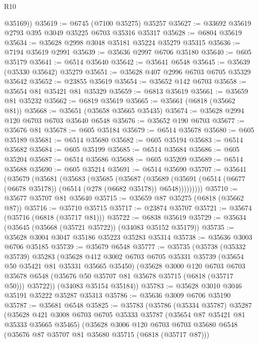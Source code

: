 \begin{lexlean}{R10}
\begin{coremodule}
        @35169))
@35619 := @6745 (@7100 @35275) @35257
@35627 := @33692 @35619 @2793 @395 @3049 @35225 @6703 @35316 @35317
@35628 := @6804 @35619
@35634 := @35628 @2998 @3048 @35181 @35224 @35279 @35315
@35636 := @7194 @35619 @2991
@35639 := @35636 @2997 @6706 @35180
@35640 := @605 @35179
@35641 := @6514 @35640
@35642 := @35641 @6548
@35645 := @35639 (@35330 @35642) @35279
@35651 := @35628 @407 @2996 @6703 @6705 @35329 @35642
@35652 := @23855 @35619
@35654 := @35652 @142 @6703
@35658 := @35654 @81 @35421 @81 @35329
@35659 := @6813 @35619
@35661 := @35659 @81 @35232
@35662 := @6819 @35619
@35665 := @35661 (@6818 (@35662 @81))
@35668 := @35651 (@35658 @35665 @35435)
@35674 := @35628 @2994 @120 @6703 @6703 @35640 @6548
@35676 := @35652 @190 @6703
@35677 := @35676 @81
@35678 := @605 @35184
@35679 := @6514 @35678
@35680 := @605 @35189
@35681 := @6514 @35680
@35682 := @605 @35194
@35683 := @6514 @35682
@35684 := @605 @35199
@35685 := @6514 @35684
@35686 := @605 @35204
@35687 := @6514 @35686
@35688 := @605 @35209
@35689 := @6514 @35688
@35690 := @605 @35214
@35691 := @6514 @35690
@35707 := @35641
    (@35679
      (@35681
        (@35683
          (@35685
            (@35687
              (@35689
                (@35691 (@6514 (@6677 (@6678 @35178)) (@6514 (@278 (@6682 @35178)) @6548)))))))))
@35710 := @35677 @35707 @81 @35640
@35715 := @35659 @87 @35275 (@6818 (@35662 @87))
@35716 := @35710 @35715
@35717 := @23874 @35707
@35721 := @35674 (@35716 (@6818 (@35717 @81)))
@35722 := @6838 @35619
@35729 := @35634 (@35645 (@35668 (@35721 @35722)) (@34083 @35152 @35179))
@35735 := @35628 @3004 @3047 @35186 @35223 @35283 @35314
@35738 := @35636 @3003 @6706 @35185
@35739 := @35679 @6548
@35777 := @35735
    (@35738
      (@35332 @35739)
      @35283
      (@35628
        @412
        @3002
        @6703
        @6705
        @35331
        @35739
        (@35654 @50 @35421 @81 @35331 @35665 @35450)
        (@35628
          @3000
          @120
          @6703
          @6703
          @35678
          @6548
          (@35676 @50 @35707 @81 @35678 @35715 (@6818 (@35717 @50)))
          @35722))
      (@34083 @35154 @35184))
@35783 := @35628 @3010 @3046 @35191 @35222 @35287 @35313
@35786 := @35636 @3009 @6706 @35190
@35787 := @35681 @6548
@35825 := @35783
    (@35786
      (@35334 @35787)
      @35287
      (@35628
        @421
        @3008
        @6703
        @6705
        @35333
        @35787
        (@35654 @87 @35421 @81 @35333 @35665 @35465)
        (@35628
          @3006
          @120
          @6703
          @6703
          @35680
          @6548
          (@35676 @87 @35707 @81 @35680 @35715 (@6818 (@35717 @87)))

\end{coremodule}
\end{lexlean}
